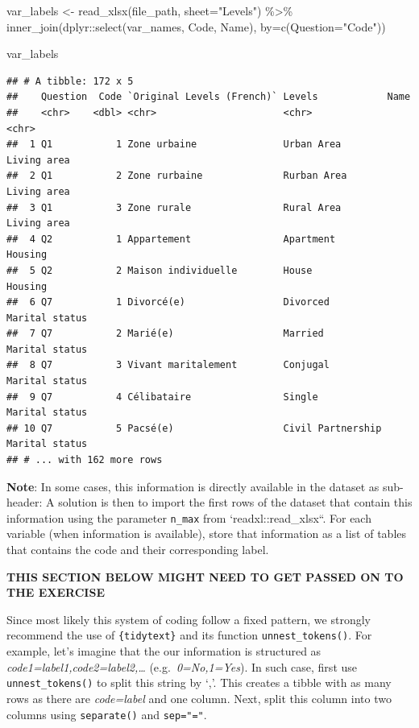 \documentclass[
]{book}
\newenvironment{Shaded}{\begin{snugshade}}{\end{snugshade}}
\newcommand{\AttributeTok}[1]{\textcolor[rgb]{0.77,0.63,0.00}{#1}}
\newcommand{\FunctionTok}[1]{\textcolor[rgb]{0.00,0.00,0.00}{#1}}
\newcommand{\NormalTok}[1]{#1}
\newcommand{\OtherTok}[1]{\textcolor[rgb]{0.56,0.35,0.01}{#1}}
\newcommand{\SpecialCharTok}[1]{\textcolor[rgb]{0.00,0.00,0.00}{#1}}
\newcommand{\StringTok}[1]{\textcolor[rgb]{0.31,0.60,0.02}{#1}}
\begin{document}
\begin{Shaded}
\begin{Highlighting}[]
\NormalTok{var\_labels }\OtherTok{\textless{}{-}} \FunctionTok{read\_xlsx}\NormalTok{(file\_path, }\AttributeTok{sheet=}\StringTok{"Levels"}\NormalTok{) }\SpecialCharTok{\%\textgreater{}\%} 
  \FunctionTok{inner\_join}\NormalTok{(dplyr}\SpecialCharTok{::}\FunctionTok{select}\NormalTok{(var\_names, Code, Name), }\AttributeTok{by=}\FunctionTok{c}\NormalTok{(}\AttributeTok{Question=}\StringTok{"Code"}\NormalTok{))}

\NormalTok{var\_labels}
\end{Highlighting}
\end{Shaded}

\begin{verbatim}
## # A tibble: 172 x 5
##    Question  Code `Original Levels (French)` Levels            Name          
##    <chr>    <dbl> <chr>                      <chr>             <chr>         
##  1 Q1           1 Zone urbaine               Urban Area        Living area   
##  2 Q1           2 Zone rurbaine              Rurban Area       Living area   
##  3 Q1           3 Zone rurale                Rural Area        Living area   
##  4 Q2           1 Appartement                Apartment         Housing       
##  5 Q2           2 Maison individuelle        House             Housing       
##  6 Q7           1 Divorcé(e)                 Divorced          Marital status
##  7 Q7           2 Marié(e)                   Married           Marital status
##  8 Q7           3 Vivant maritalement        Conjugal          Marital status
##  9 Q7           4 Célibataire                Single            Marital status
## 10 Q7           5 Pacsé(e)                   Civil Partnership Marital status
## # ... with 162 more rows
\end{verbatim}

\textbf{Note}: In some cases, this information is directly available in the dataset as sub-header: A solution is then to import the first rows of the dataset that contain this information using the parameter \texttt{n\_max} from `readxl::read\_xlsx``. For each variable (when information is available), store that information as a list of tables that contains the code and their corresponding label.

\textbf{THIS SECTION BELOW MIGHT NEED TO GET PASSED ON TO THE EXERCISE}

Since most likely this system of coding follow a fixed pattern, we strongly recommend the use of \texttt{\{tidytext\}} and its function \texttt{unnest\_tokens()}.
For example, let's imagine that the our information is structured as \emph{code1=label1,code2=label2,\ldots{}} (e.g.~\emph{0=No,1=Yes}). In such case, first use \texttt{unnest\_tokens()} to split this string by `,'. This creates a tibble with as many rows as there are \emph{code=label} and one column. Next, split this column into two columns using \texttt{separate()} and \texttt{sep="="}.
\end{document}
